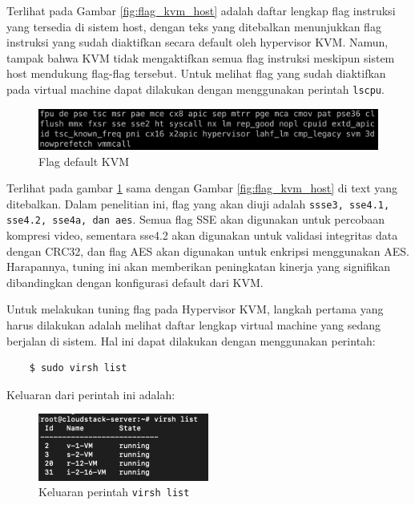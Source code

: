 Terlihat pada Gambar \ref{fig:flag_kvm_host} adalah daftar lengkap flag instruksi yang tersedia di sistem host, dengan teks yang ditebalkan menunjukkan flag instruksi yang sudah diaktifkan secara default oleh hypervisor KVM. Namun, tampak bahwa KVM tidak mengaktifkan semua flag instruksi meskipun sistem host mendukung flag-flag tersebut. Untuk melihat flag yang sudah diaktifkan pada virtual machine dapat dilakukan dengan menggunakan perintah \texttt{lscpu}.


\begin{figure}
    \centering
    \includegraphics[width=1\textwidth]
    {assets/pics/lscpu_original.jpeg}
    \caption{Flag default KVM}
    \label{fig:lscpu_original}
\end{figure}

Terlihat pada gambar \ref{fig:lscpu_original} sama dengan Gambar \ref{fig:flag_kvm_host} di text yang ditebalkan. Dalam penelitian ini, flag yang akan diuji adalah \texttt{ssse3, sse4.1, sse4.2, sse4a, dan aes}. Semua flag SSE akan digunakan untuk percobaan kompresi video, sementara sse4.2 akan digunakan untuk validasi integritas data dengan CRC32, dan flag AES akan digunakan untuk enkripsi menggunakan AES. Harapannya, tuning ini akan memberikan peningkatan kinerja yang signifikan dibandingkan dengan konfigurasi default dari KVM.

Untuk melakukan tuning flag pada Hypervisor KVM, langkah pertama yang harus dilakukan adalah melihat daftar lengkap virtual machine yang sedang berjalan di sistem. Hal ini dapat dilakukan dengan menggunakan perintah:

\begin{listing}[H]
    \begin{verbatim}
    $ sudo virsh list
    \end{verbatim}
\end{listing}

Keluaran dari perintah ini adalah:
\begin{figure}
    \centering
    \includegraphics[width=0.5\textwidth]
    {assets/pics/virsh_list.png}
    \caption{Keluaran perintah \texttt{virsh list}}
    \label{fig:virsh_list}
\end{figure}

